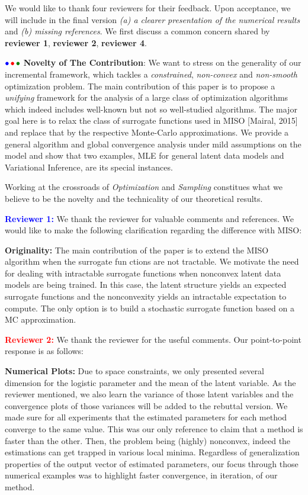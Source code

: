\documentclass{article}
\begin{document}
We would like to thank four reviewers for their feedback. Upon acceptance, we will include in the final version \emph{{\sf (a)} a clearer presentation of the numerical results} and \emph{{\sf (b)} missing references}. 
We first discuss a common concern shared by \textbf{\color{blue}reviewer 1}, \textbf{\color{red} reviewer 2}, \textbf{\color{green!50!black}reviewer 4}.

${\color{blue}\bullet}\!~{\color{red}\bullet}\!~{\color{green!50!black}\bullet}$ \textbf{Novelty of The Contribution}: 
We want to stress on the generality of our incremental framework, which tackles a \emph{constrained}, \emph{non-convex} and \emph{non-smooth} optimization problem. 
The main contribution of this paper is to propose a \emph{unifying} framework for the analysis of a large class of optimization algorithms which indeed includes well-known but not so well-studied algorithms.
The major goal here is to relax the class of surrogate functions used in MISO [Mairal, 2015] and replace that by the respective Monte-Carlo approximations.
We provide a general algorithm and global convergence analysis under mild assumptions on the model and show that two examples, MLE for general latent data models and Variational Inference, are its special instances.

Working at the crossroads of \emph{Optimization} and \emph{Sampling} constitues what we believe to be the novelty and the technicality of our theoretical results.


\textbf{\textcolor{blue}{Reviewer 1:}} We thank the reviewer for valuable comments and references. We would like to make the following clarification regarding the difference with MISO:

\textbf{Originality:} The main contribution of the paper is to extend the MISO algorithm when the surrogate fun
ctions are not tractable. We motivate the need for dealing with intractable surrogate functions when nonconvex latent data models are being trained. In this case, the latent structure yields an expected surrogate functions and the nonconvexity yields an intractable expectation to compute. The only option is to build a stochastic surrogate function based on a MC approximation.


\textbf{\textcolor{red}{Reviewer 2:}} We thank the reviewer for the useful comments. Our point-to-point response is as follows:

\textbf{Numerical Plots:} Due to space constraints, we only presented several dimension for the logistic parameter and the mean of the latent variable. As the reviewer mentioned, we also learn the variance of those latent variables and the convergence plots of those variances will be added to the rebuttal version.
We made sure for all experiments that the estimated parameters for each method converge to the same value. This was our only reference to claim that a method is faster than the other. Then, the problem being (highly) nonconvex, indeed the estimations can get trapped in various local minima. Regardless of generalization properties of the output vector of estimated parameters, our focus through those numerical examples was to highlight faster convergence, in iteration, of our method.
\end{document}
